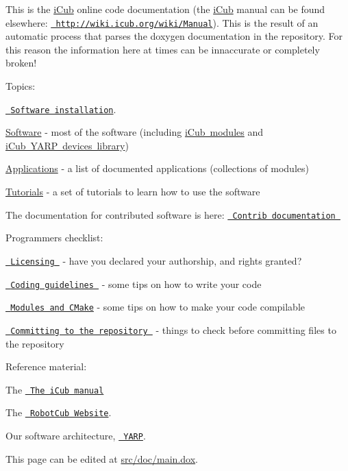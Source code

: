 

This is the \mbox{\hyperlink{namespaceiCub}{i\+Cub}} online code documentation (the \mbox{\hyperlink{namespaceiCub}{i\+Cub}} manual can be found elsewhere\+: \href{http://wiki.icub.org/wiki/Manual}{\texttt{ http\+://wiki.\+icub.\+org/wiki/\+Manual}}). This is the result of an automatic process that parses the doxygen documentation in the repository. For this reason the information here at times can be innaccurate or completely broken!

Topics\+:


\begin{DoxyItemize}
\item \href{http://wiki.icub.org/wiki/ICub_Software_Installation}{\texttt{ Software installation}}.
\item \mbox{\hyperlink{group__icub__modules__all}{Software}} -\/ most of the software (including \mbox{\hyperlink{group__icub__module}{i\+Cub modules}} and \mbox{\hyperlink{group__icub__mod__library}{i\+Cub YARP devices library}})
\item \mbox{\hyperlink{group__icub__applications}{Applications}} -\/ a list of documented applications (collections of modules)
\item \mbox{\hyperlink{icub_tutorials}{Tutorials}} -\/ a set of tutorials to learn how to use the software
\item The documentation for contributed software is here\+: \href{http://wiki.icub.org/iCub/contrib}{\texttt{ Contrib documentation }}
\item Programmer\textquotesingle{}s checklist\+:
\begin{DoxyItemize}
\item \href{http://wiki.icub.org/wiki/Licensing}{\texttt{ Licensing }} -\/ have you declared your authorship, and rights granted?
\item \href{http://wiki.icub.org/wiki/Manual\#Eleven._Guidelines}{\texttt{ Coding guidelines }} -\/ some tips on how to write your code
\item \href{http://wiki.icub.org/wiki/Manual\#Ten._Standardization_of_methods}{\texttt{ Modules and CMake}} -\/ some tips on how to make your code compilable
\item \href{http://wiki.icub.org/wiki/Committing_changes_to_the_software_repository}{\texttt{ Committing to the repository }} -\/ things to check before committing files to the repository
\end{DoxyItemize}
\item Reference material\+:
\begin{DoxyItemize}
\item The \href{http://wiki.icub.org/wiki/Manual}{\texttt{ The i\+Cub manual}}
\item The \href{http://www.robotcub.org/}{\texttt{ Robot\+Cub Website}}.
\item Our software architecture, \href{http://www.yarp.it/}{\texttt{ YARP}}.
\end{DoxyItemize}
\end{DoxyItemize}

This page can be edited at \mbox{\hyperlink{main_8dox}{src/doc/main.\+dox}}. 